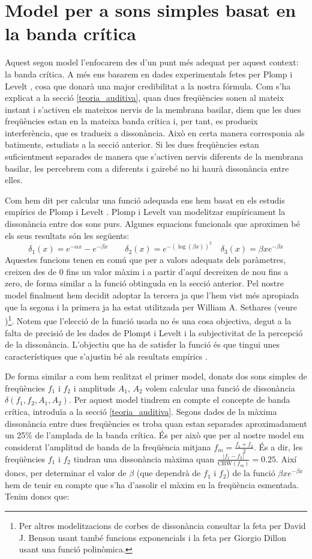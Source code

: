 \documentclass{article}
\theoremstyle{definition}
\newcommand{\0}{\ensuremath{\vb{0}}}
\begin{document}
\section{Model per a sons simples basat en la banda crítica}
Aquest segon model l'enfocarem des d'un punt més adequat per aquest context: la banda crítica. A més ens basarem en dades experimentals fetes per Plomp i Levelt \cite{plomp}, cosa que donarà una major credibilitat a la nostra fórmula. Com s'ha explicat a la secció \ref{teoria_auditiva}, quan dues freqüències sonen al mateix instant i s'activen els mateixos nervis de la membrana basilar, diem que les dues freqüències estan en la mateixa banda crítica i, per tant, es produeix interferència, que es tradueix a dissonància. Això en certa manera corresponia als batiments, estudiats a la secció anterior. Si les dues freqüències estan suficientment separades de manera que s'activen nervis diferents de la membrana basilar, les percebrem com a diferents i gairebé no hi haurà dissonància entre elles.\par 
Com hem dit per calcular una funció adequada ens hem basat en els estudis empírics de Plomp i Levelt \cite{plomp}. Plomp i Levelt van modelitzar empíricament la dissonància entre dos sons purs. Algunes equacions funcionals que aproximen bé els seus resultats són les següents: $$\delta_1(x)=e^{-\alpha x}-e^{-\beta x}\qquad\delta_2(x)=e^{-\left(\log(\beta x)\right)^2}\quad\delta_3(x)=\beta xe^{-\beta x}$$
Aquestes funcions tenen en comú que per a valors adequats dels paràmetres, creixen des de 0 fins un valor màxim i a partir d'aquí decreixen de nou fins a zero, de forma similar a la funció obtinguda en la secció anterior. Pel nostre model finalment hem decidit adoptar la tercera ja que l'hem vist més apropiada que la segona i la primera ja ha estat utilitzada per William A. Sethares (veure \cite{sethares1})\footnote{Per altres modelitzacions de corbes de dissonància consultar la feta per David J. Benson \cite{benson} usant també funcions exponencials i la feta per Giorgio Dillon \cite{dillon} usant una funció polinòmica.}. Notem que l'elecció de la funció usada no és una cosa objectiva, degut a la falta de precisió de les dades de Plompt i Levelt i la subjectivitat de la percepció de la dissonància. L'objectiu que ha de satisfer la funció és que tingui unes característiques que s'ajustin bé als resultats empírics \cite{benson}.\par
De forma similar a com hem realitzat el primer model, donats dos sons simples de freqüències $f_1$ i $f_2$ i amplituds $A_1$, $A_2$ volem calcular una funció de dissonància $\delta(f_1,f_2,A_1,A_2)$. Per aquest model tindrem en compte el concepte de banda crítica, introduïa a la secció \ref{teoria_auditiva}. Segons dades de \cite{zwicker} la màxima dissonància entre dues freqüències es troba quan estan separades aproximadament un 25\% de l'amplada de la banda crítica. És per això que per al nostre model em considerat l'amplitud de banda de la freqüència mitjana $f_m=\frac{f_1+f_2}{2}$. És a dir, les freqüències $f_1$ i $f_2$ tindran una dissonància màxima quan $\frac{|f_1-f_2|}{\text{CBW}(f_m)}=0.25$. Així doncs, per determinar el valor de $\beta$ (que dependrà de $f_1$ i $f_2$) de la funció $\beta xe^{-\beta x}$ hem de tenir en compte que s'ha d'assolir el màxim en la freqüència esmentada. Tenim doncs que:
\end{document}
